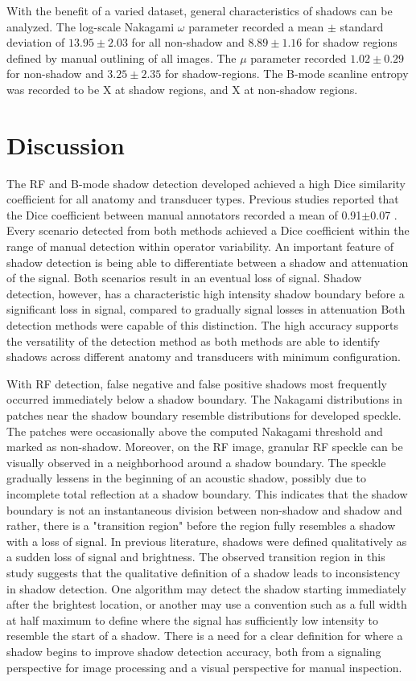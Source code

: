 \documentclass[preprint,5p,authoryear]{elsarticle}
\begin{document}
With the benefit of a varied dataset, general characteristics of shadows can be analyzed. The log-scale Nakagami $\omega$ parameter recorded a mean $\pm$ standard deviation of $13.95\pm2.03$ for all non-shadow and $8.89\pm1.16$ for shadow regions defined by manual outlining of all images. The $\mu$ parameter recorded $1.02\pm0.29$ for non-shadow and $3.25\pm2.35$ for shadow-regions. The B-mode scanline entropy was recorded to be X at shadow regions, and X at non-shadow regions.

\section*{Discussion}
\label{Discuss}
The RF and B-mode shadow detection developed achieved a high Dice similarity coefficient for all anatomy and transducer types. Previous studies reported that the Dice coefficient between manual annotators recorded a mean of 0.91$\pm$0.07 \citep{Hellier2010}. Every scenario detected from both methods achieved a Dice coefficient within the range of manual detection within operator variability. An important feature of shadow detection is being able to differentiate between a shadow and attenuation of the signal. Both scenarios result in an eventual loss of signal. Shadow detection, however, has a characteristic high intensity shadow boundary before a significant loss in signal, compared to gradually signal losses in attenuation Both detection methods were capable of this distinction. The high accuracy supports the versatility of the detection method as both methods are able to identify shadows across different anatomy and transducers with minimum configuration. 

With RF detection, false negative and false positive shadows most frequently occurred immediately below a shadow boundary. The Nakagami distributions in patches near the shadow boundary resemble distributions for developed speckle. The patches were occasionally above the computed Nakagami threshold and marked as non-shadow. Moreover, on the RF image, granular RF speckle can be visually observed in a neighborhood around a shadow boundary. The speckle gradually lessens in the beginning of an acoustic shadow, possibly due to incomplete total reflection at a shadow boundary. This indicates that the shadow boundary is not an instantaneous division between non-shadow and shadow and rather, there is a "transition region" before the region fully resembles a shadow with a loss of signal. In previous literature, shadows were defined qualitatively \citep{Kremkau1986} as a sudden loss of signal and brightness. The observed transition region in this study suggests that the qualitative definition of a shadow leads to inconsistency in shadow detection. One algorithm may detect the shadow starting immediately after the brightest location, or another may use a convention such as a full width at half maximum to define where the signal has sufficiently low intensity to resemble the start of a shadow. There is a need for a clear definition for where a shadow begins to improve shadow detection accuracy, both from a signaling perspective for image processing and a visual perspective for manual inspection. 
\end{document}
